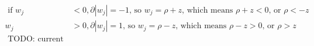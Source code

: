 \newcommand{\matrix}[1]{\mathbf{#1}}
\newcommand{\vector}[1]{\mathbf{#1}}
\newcommand{\X}{\matrix{X}}
\newcommand{\y}{\vector{y}}
\newcommand{\w}{\vector{w}}
\newcommand{\r}{\vector{r}}
\begin{align*}
\text{ if } w_j &< 0, \partial |w_j| = -1 \text{, so } w_j = \rho + z \text{, which means } \rho + z < 0 \text{, or } \rho < -z \\
            w_j &> 0, \partial |w_j| =  1 \text{, so } w_j = \rho - z \text{, which means } \rho - z > 0 \text{, or } \rho >  z \\
\text{ TODO: current spot } \\
\end{align*}
